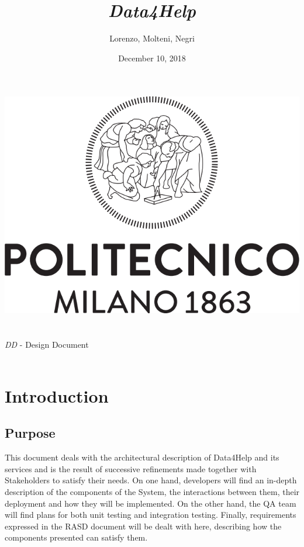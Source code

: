 \documentclass[titlepage]{article}
\title{{\Huge {\it Data4Help}}}
\author{Lorenzo, Molteni, Negri}
\date{December 10, 2018}
\begin{document}
\makeatletter
    \begin{titlepage}
        \begin{center}
            \includegraphics[width=\linewidth]{logo.png}\\[20ex]
            {\huge  \@title }\\[2ex] 
            {\LARGE  \@author}\\[3ex] 
            {\LARGE {\it DD} - Design Document}\\[3ex]
            {\large \@date}\\[5ex]
        \end{center}
    \end{titlepage}
\makeatother
\thispagestyle{empty}
\newpage

\thispagestyle{empty}
\newpage


	
\pagebreak
\tableofcontents{}
\pagebreak

\section{Introduction}
\subsection{Purpose}
This document deals with the architectural description of Data4Help and its services and is the result of successive refinements made together with Stakeholders to satisfy their needs. 
On one hand, developers will find an in-depth description of the components of the System, the interactions between them, their deployment and how they will be implemented.
On the other hand, the QA team will find plans for both unit testing and integration testing.
Finally, requirements expressed in the RASD document will be dealt with here, describing how the components presented can satisfy them.
\end{document}
